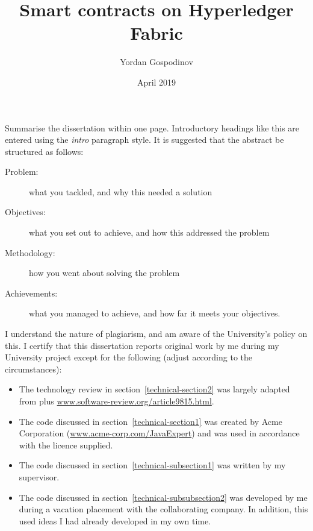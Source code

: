 \documentclass[a4paper,11pt]{report}
\title{Smart contracts on Hyperledger Fabric}
\author{Yordan Gospodinov}
\date{April 2019}
\begin{document}
\maketitle				





Summarise the dissertation within one page. Introductory headings like this are
entered using the {\it intro} paragraph style. It is suggested that the abstract
be structured as follows:

\begin{description}

  \item[Problem:]
  what you tackled, and why this needed a solution

  \item[Objectives:]
  what you set out to achieve, and how this addressed the problem

  \item[Methodology:]
  how you went about solving the problem

  \item[Achievements:]
  what you managed to achieve, and how far it meets your objectives.

\end{description}




I understand the nature of plagiarism, and am aware of the University's policy
on this. I certify that this dissertation reports original work by me during my
University project except for the following (adjust according to the
circumstances):

\begin{itemize}

  \item
  The technology review in section~\ref{technical-section2} was largely adapted
  from \cite{Greene-Williams-1997} plus
  \url{www.software-review.org/article9815.html}.

  \item
  The code discussed in section~\ref{technical-section1} was created by Acme
  Corporation (\url{www.acme-corp.com/JavaExpert}) and was used in accordance
  with the licence supplied.

  \item
  The code discussed in section~\ref{technical-subsection1} was written by my
  supervisor.

  \item
  The code discussed in section~\ref{technical-subsubsection2} was developed by
  me during a vacation placement with the collaborating company. In addition,
  this used ideas I had already developed in my own time.

\end{itemize}
\end{document}
